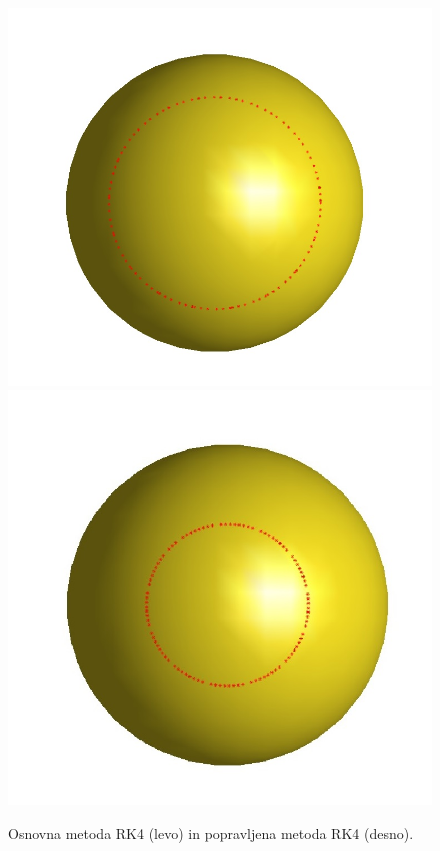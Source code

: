 \documentclass[12pt]{article}
\begin{document}
    \begin{figure}[H]
        \centering
        \includegraphics[scale=0.30]{rk4}
    	\includegraphics[scale=0.30]{rk4_newt}
	    \caption{Osnovna metoda RK4 (levo) in popravljena metoda RK4 (desno).}
    	\label{slika:rk4,rk4_newt}
	\end{figure}
\end{document}

